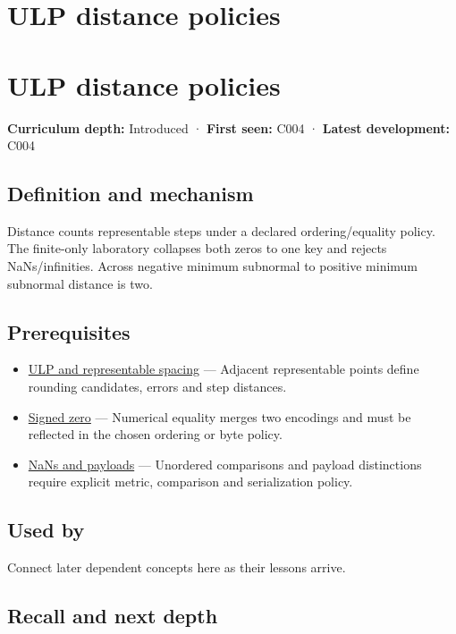 \hypertarget{appendix-deca299ae4b8}{}
\section*{ULP distance policies}
\section{ULP distance policies}\label{ulp-distance-policies}

\textbf{Curriculum depth:} Introduced · \textbf{First seen:} C004 · \textbf{Latest development:} C004

\subsection{Definition and mechanism}\label{definition-and-mechanism}

Distance counts representable steps under a declared ordering/equality policy. The finite-only laboratory collapses both zeros to one key and rejects NaNs/infinities. Across negative minimum subnormal to positive minimum subnormal distance is two.

\subsection{Prerequisites}\label{prerequisites}

\begin{itemize}
\tightlist
\item
  \hyperref[appendix-14bab4cab9d4]{ULP and representable spacing} --- Adjacent representable points define rounding candidates, errors and step distances.
\item
  \hyperref[appendix-3a048f032c1f]{Signed zero} --- Numerical equality merges two encodings and must be reflected in the chosen ordering or byte policy.
\item
  \hyperref[appendix-d6607cc4c235]{NaNs and payloads} --- Unordered comparisons and payload distinctions require explicit metric, comparison and serialization policy.
\end{itemize}

\subsection{Used by}\label{used-by}

Connect later dependent concepts here as their lessons arrive.

\subsection{Recall and next depth}\label{recall-and-next-depth}

